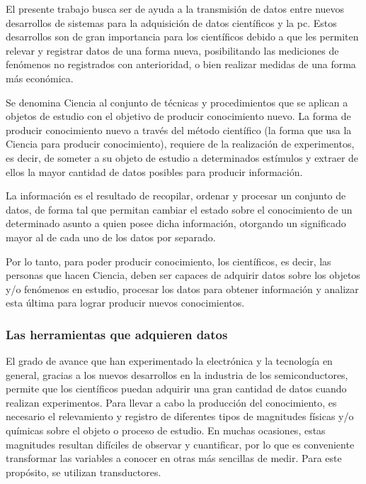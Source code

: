 
El presente trabajo busca ser de ayuda a la transmisión de datos entre nuevos desarrollos de sistemas para la adquisición de datos científicos y la \acrshort{pc}. Estos desarrollos son de gran importancia para los científicos debido a que les permiten relevar y registrar datos de una forma nueva, posibilitando las mediciones de fenómenos no registrados con anterioridad, o bien realizar medidas de una forma más económica.

Se denomina Ciencia al conjunto de técnicas y procedimientos que se aplican a objetos de estudio con el objetivo de producir conocimiento nuevo.
La forma de producir conocimiento nuevo a través del método científico (la forma que usa la Ciencia para producir conocimiento), requiere de la realización de experimentos, es decir, de someter a su objeto de estudio a determinados estímulos y extraer de ellos la mayor cantidad de datos posibles para producir información.

La información es el resultado de recopilar, ordenar y procesar un conjunto de datos, de forma tal que permitan cambiar el estado sobre el conocimiento de un determinado asunto a quien posee dicha información, otorgando un significado mayor al de cada uno de los datos por separado.

Por lo tanto, para poder producir conocimiento, los científicos, es decir, las personas que hacen Ciencia, deben ser capaces de adquirir datos sobre los objetos y/o fenómenos en estudio, procesar los datos para obtener información y analizar esta última para lograr producir nuevos conocimientos.

\subsubsection{Las herramientas que adquieren datos}
El grado de avance que han experimentado la electrónica y la tecnología en general, gracias a los nuevos desarrollos en la industria de los semiconductores, permite que los científicos puedan adquirir una gran cantidad de datos cuando realizan experimentos. Para llevar a cabo la producción del conocimiento, es necesario el relevamiento y registro de diferentes tipos de magnitudes físicas y/o químicas sobre el objeto o proceso de estudio. En muchas ocasiones, estas magnitudes resultan difíciles de observar y cuantificar, por lo que es conveniente transformar las variables a conocer en otras más sencillas de medir. Para este propósito, se utilizan transductores.%


